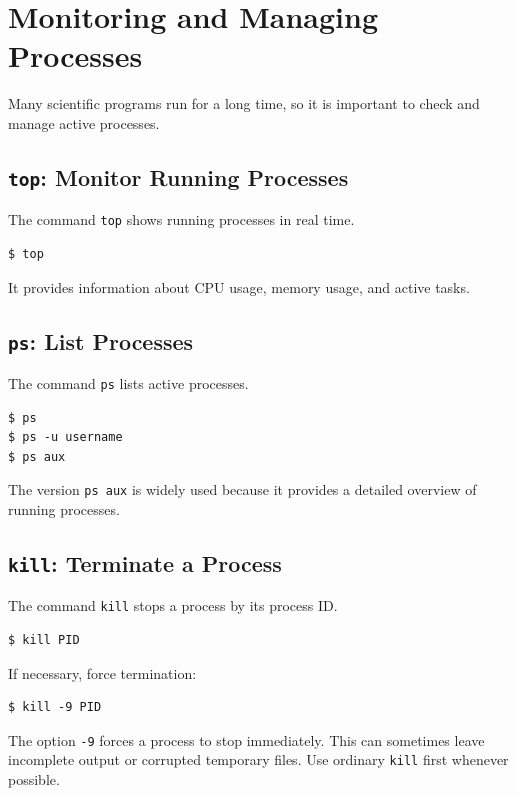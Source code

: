 \section{Monitoring and Managing Processes}

Many scientific programs run for a long time, so it is important to
check and manage active processes.

\subsection{\texttt{top}: Monitor Running Processes}

The command \texttt{top} shows running processes in real time.

\begin{lstlisting}
$ top
\end{lstlisting}

It provides information about CPU usage, memory usage, and active tasks.

\subsection{\texttt{ps}: List Processes}

The command \texttt{ps} lists active processes.

\begin{lstlisting}
$ ps
$ ps -u username
$ ps aux
\end{lstlisting}

The version \texttt{ps aux} is widely used because it provides a detailed
overview of running processes.

\subsection{\texttt{kill}: Terminate a Process}

The command \texttt{kill} stops a process by its process ID.

\begin{lstlisting}
$ kill PID
\end{lstlisting}

If necessary, force termination:

\begin{lstlisting}
$ kill -9 PID
\end{lstlisting}

\begin{warnbox}
The option \texttt{-9} forces a process to stop immediately. This can
sometimes leave incomplete output or corrupted temporary files. Use
ordinary \texttt{kill} first whenever possible.
\end{warnbox}

